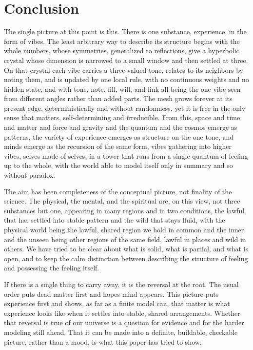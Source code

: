\section{Conclusion}
\label{sec:conclusion}

The single picture at this point is this. There is one substance, experience, in the
form of vibes. The least arbitrary way to describe its structure begins with the whole numbers,
whose symmetries, generalized to reflections, give a hyperbolic crystal whose dimension is
narrowed to a small window and then settled at three. On that crystal each vibe carries a
three-valued tone, relates to its neighbors by noting them, and is updated by one local rule,
with no continuous weights and no hidden state, and with tone, note, fill, will, and link all
being the one vibe seen from different angles rather than added parts. The mesh grows forever at
its present edge, deterministically and without randomness, yet it is free in the only sense
that matters, self-determining and irreducible. From this, space and time and matter and force
and gravity and the quantum and the cosmos emerge as patterns, the variety of experience emerges
as structure on the one tone, and minds emerge as the recursion of the same form, vibes
gathering into higher vibes, selves made of selves, in a tower that runs from a single quantum of
feeling up to the whole, with the world able to model itself only in summary and so without
paradox.

The aim has been completeness of the conceptual picture, not finality of the science. The
physical, the mental, and the spiritual are, on this view, not three substances but one,
appearing in many regions and in two conditions, the lawful that has settled into stable pattern
and the wild that stays fluid, with the physical world being the lawful, shared region we hold in
common and the inner and the unseen being other regions of the same field, lawful in places and
wild in others. We have tried to be clear about what is solid, what is partial, and what is open,
and to keep the calm distinction between describing the structure of feeling and possessing the
feeling itself.

If there is a single thing to carry away, it is the reversal at the root. The usual order puts
dead matter first and hopes mind appears. This picture puts experience first and shows, as far as
a finite model can, that matter is what experience looks like when it settles into stable, shared
arrangements. Whether that reversal is true of our universe is a question for evidence and for
the harder modeling still ahead. That it can be made into a definite, buildable, checkable
picture, rather than a mood, is what this paper has tried to show.
